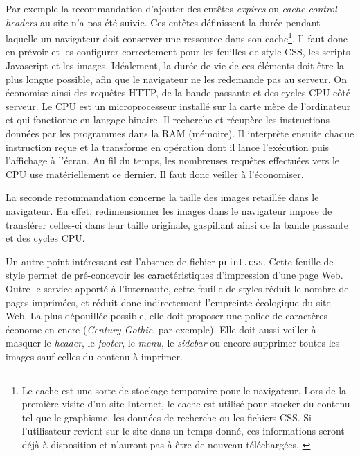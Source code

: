 \documentclass[a4paper,12pt,twoside]{book}
\begin{document}
Par exemple la recommandation d'ajouter des entêtes \textit{expires} ou \textit{cache-control headers} au site n'a pas été suivie. Ces entêtes définissent la durée pendant laquelle un navigateur doit conserver une ressource dans son cache\footnote{Le cache est une sorte de stockage temporaire pour le navigateur. Lors de la première visite d'un site Internet, le cache est utilisé pour stocker du contenu tel que le graphisme, les données de recherche ou les fichiers CSS. Si l'utilisateur revient sur le site dans un temps donné, ces informations seront déjà à disposition et n'auront pas à être de nouveau téléchargées. \cite{cache}}. Il faut donc en prévoir et les configurer correctement pour les feuilles de style \acrshort{CSS}, les scripts Javascript et les images. Idéalement, la durée de vie de ces éléments doit être la plus longue possible, afin que le navigateur ne les redemande pas au serveur. On économise ainsi des requêtes HTTP, de la bande passante et des cycles \acrshort{CPU} côté serveur. Le \acrfull{CPU} est un microprocesseur installé sur la carte mère de l'ordinateur et qui fonctionne en langage binaire. Il recherche et récupère les instructions données par les programmes dans la RAM (mémoire). Il interprète ensuite chaque instruction reçue et la transforme en opération dont il lance l'exécution puis l'affichage à l'écran. Au fil du temps, les nombreuses requêtes effectuées vers le \acrshort{CPU} use matériellement ce dernier. Il faut donc veiller à l'économiser. 

La seconde recommandation concerne la taille des images retaillée dans le navigateur. En effet, redimensionner les images dans le navigateur impose de transférer celles-ci dans leur taille originale, gaspillant ainsi de la bande passante et des cycles \acrshort{CPU}. 

Un autre point intéressant est l'absence de fichier \texttt{print.css}. Cette feuille de style permet de pré-concevoir les caractéristiques d'impression d'une page Web. Outre le service apporté à l'internaute, cette feuille de styles réduit le nombre de pages imprimées, et réduit donc indirectement l'empreinte écologique du site Web. La plus dépouillée possible, elle doit proposer une police de caractères économe en encre (\textit{Century Gothic}, par exemple). Elle doit aussi veiller à masquer le \textit{header}, le \textit{footer}, le \textit{menu}, le \textit{sidebar} ou encore supprimer toutes les images sauf celles du contenu à imprimer.
\end{document}
